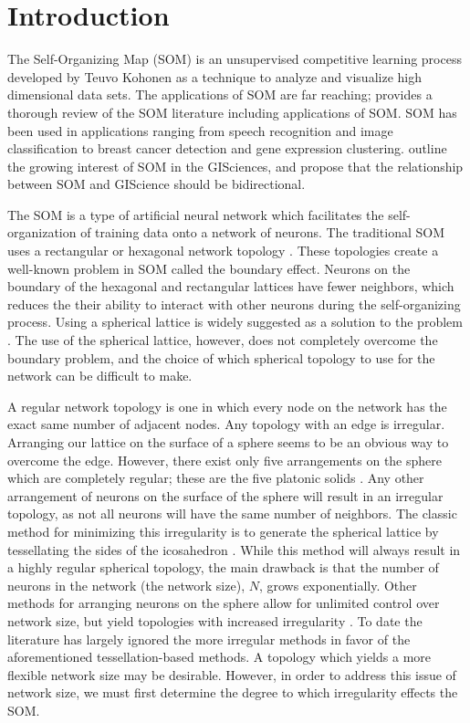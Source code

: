 \documentclass[10pt,titlepage]{article}
\begin{document}
\section{Introduction}
The Self-Organizing Map (SOM) is an unsupervised competitive learning process
developed by Teuvo Kohonen as a technique to analyze and visualize high
dimensional data sets.  The applications of SOM are far reaching;
\cite{Kohonen2000} provides a thorough review of the SOM literature including
applications of SOM.  SOM has been used in applications ranging from speech
recognition and image classification to breast cancer detection and gene
expression clustering.  \cite{skupin07} outline the growing interest of SOM in
the GISciences, and propose that the relationship between SOM and GIScience
should be bidirectional.

The SOM is a type of artificial neural network which facilitates the
self-organization of training data onto a network of neurons. The traditional
SOM uses a rectangular or hexagonal network topology \citep{Kohonen2000}.  These topologies 
create a well-known problem in SOM called the boundary effect.  Neurons on
the boundary of the hexagonal and rectangular lattices have fewer neighbors,
which reduces the their ability to interact with other neurons during the
self-organizing process.  Using a spherical lattice is widely suggested as a
solution to the problem \citep{ritter99, boudjemai2003, sangole03,
Nishio:2006fk, wu2006}. The use of the spherical lattice, however, does not
completely overcome the boundary problem, and the choice of which spherical
topology to use for the network can be difficult to make.

A regular network topology is one in which every node on the network has the
exact same number of adjacent nodes.  Any topology with an edge is irregular.
Arranging our lattice on the surface of a sphere seems to be an obvious
way to overcome the edge.  However, there exist only five arrangements on the
sphere which are completely regular; these are the five platonic solids \citep{ritter99,
harris2000}.  Any other arrangement of neurons on the surface of the sphere will
result in an irregular topology, as not all neurons will have the same number of
neighbors.  The classic method for minimizing this irregularity is to generate
the spherical lattice by tessellating the sides of the icosahedron
\citep{Nishio:2006fk}.  While this method will always result in a highly
regular spherical topology, the main drawback is that the number of neurons in
the network (the network size), \(N\),
grows exponentially. Other methods for arranging neurons on the sphere allow
for unlimited control over network size, but yield topologies with increased
irregularity \citep{harris2000, wu2005, Nishio:2006fk}.  To date the
literature has largely ignored the more irregular methods in favor of the
aforementioned tessellation-based methods.  A topology which yields a more flexible network
size may be desirable.  However, in order to address this issue of network
size, we must first determine the degree to which irregularity effects the
SOM.
\end{document}

